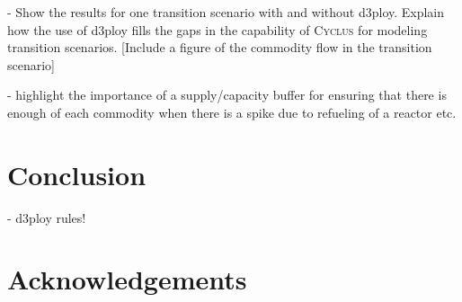 \documentclass[11pt,letterpaper]{article}
\newcommand{\Cyclus}{\textsc{Cyclus}\xspace}%
\begin{document}
- Show the results for one transition scenario with and without
d3ploy. Explain how the use of d3ploy fills the gaps in the 
capability of \Cyclus for modeling transition scenarios. 
[Include a figure of the commodity flow in the transition scenario]  

- highlight the importance of a supply/capacity buffer for 
ensuring that there is enough of each commodity when there is 
a spike due to refueling of a reactor etc. 

\section{Conclusion}
- d3ploy rules! 

\section{Acknowledgements}


\pagebreak 


\end{document}

